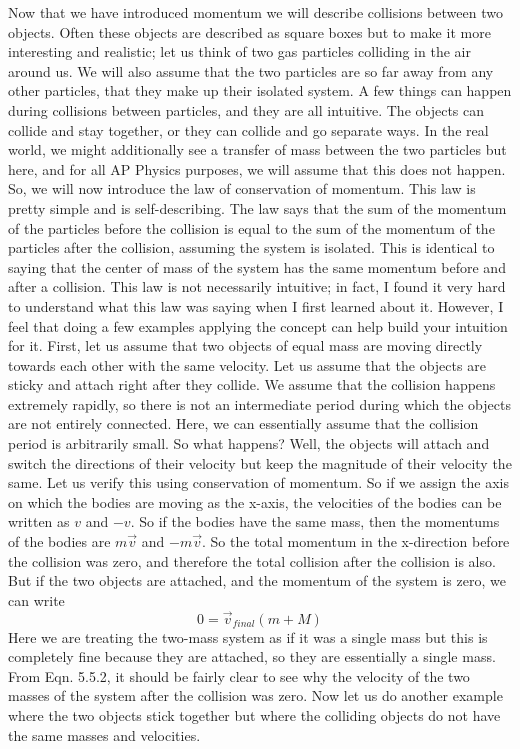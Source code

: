 Now that we have introduced momentum we will describe collisions between two objects. Often these objects are described as square boxes but to make it more interesting and realistic; let us think of two gas particles colliding in the air around us. We will also assume that the two particles are so far away from any other particles, that they make up their isolated system. A few things can happen during collisions between particles, and they are all intuitive. The objects can collide and stay together, or they can collide and go separate ways. In the real world, we might additionally see a transfer of mass between the two particles but here, and for all AP Physics purposes, we will assume that this does not happen. So, we will now introduce the law of conservation of momentum. This law is pretty simple and is self-describing. The law says that the sum of the momentum of the particles before the collision is equal to the sum of the momentum of the particles after the collision,  assuming the system is isolated. This is identical to saying that the center of mass of the system has the same momentum before and after a collision. This law is not necessarily intuitive; in fact, I found it very hard to understand what this law was saying when I first learned about it. However, I feel that doing a few examples applying the concept can help build your intuition for it. First, let us assume that two objects of equal mass are moving directly towards each other with the same velocity. Let us assume that the objects are sticky and attach right after they collide. We assume that the collision happens extremely rapidly, so there is not an intermediate period during which the objects are not entirely connected. Here, we can essentially assume that the collision period is arbitrarily small. So what happens? Well, the objects will attach and switch the directions of their velocity but keep the magnitude of their velocity the same. Let us verify this using conservation of momentum.  So if we assign the axis on which the bodies are moving as the x-axis, the velocities of the bodies can be written as $v$ and $-v$. So if the bodies have the same mass, then the momentums of the bodies are $m\vec{v}$ and $-m\vec{v}$. So the total momentum in the x-direction before the collision was zero, and therefore the total collision after the collision is also. But if the two objects are attached, and the momentum of the system is zero, we can write \begin{equation}0=\vec{v}_{final} \left(m+M\right)\end{equation} Here we are treating the two-mass system as if it was a single mass but this is completely fine because they are attached, so they are essentially a single mass. From Eqn. 5.5.2, it should be fairly clear to see why the velocity of the two masses of the system after the collision was zero. Now let us do another example where the two objects stick together but where the colliding objects do not have the same masses and velocities. 

